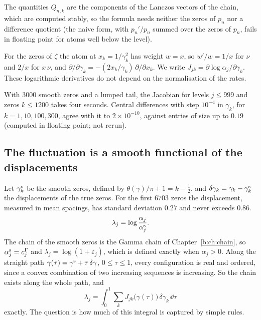 The quantities $Q_{n,k}$ are the components of the Lanczos vectors of the chain, which are computed stably, so the formula needs neither the zeros of $p_n$ nor a difference quotient (the naive form, with $p_n'/p_n$ summed over the zeros of $p_n$, fails in floating point for atoms well below the level).

For the zeros of $\zeta$ the atom at $x_k=1/\gamma_k^2$ has weight $w=x$, so $w'/w=1/x$ for $\nu$ and $2/x$ for $x\,\nu$, and $\partial/\partial\gamma_k=-(2x_k/\gamma_k)\,\partial/\partial x_k$. We write $J_{jk}=\partial\log\alpha_j/\partial\gamma_k$. These logarithmic derivatives do not depend on the normalisation of the rates.

\begin{computation}\label{pp:comp:check}
With $3000$ smooth zeros and a lumped tail, the Jacobian for levels $j\le999$ and zeros $k\le1200$ takes four seconds. Central differences with step $10^{-4}$ in $\gamma_k$, for $k=1,10,100,300$, agree with it to $2\times10^{-10}$, against entries of size up to $0.19$ (computed in floating point; not rerun).
\end{computation}

\subsection{The fluctuation is a smooth functional of the displacements}

Let $\gamma_k^{\rm s}$ be the smooth zeros, defined by $\theta(\gamma)/\pi+1=k-\frac12$, and $\delta\gamma_k=\gamma_k-\gamma_k^{\rm s}$ the displacements of the true zeros. For the first $6703$ zeros the displacement, measured in mean spacings, has standard deviation $0.27$ and never exceeds $0.86$.
\[
\lambda_j=\log\frac{\alpha_j}{\alpha^{\rm s}_j}.
\]
The chain of the smooth zeros is the Gamma chain of Chapter~\ref{b:ch:chain}, so $\alpha^{\rm s}_j=c^\Gamma_j$ and $\lambda_j=\log(1+\varepsilon_j)$, which is defined exactly when $\alpha_j>0$. Along the straight path $\gamma(\tau)=\gamma^{\rm s}+\tau\,\delta\gamma$, $0\le\tau\le1$, every configuration is real and ordered, since a convex combination of two increasing sequences is increasing. So the chain exists along the whole path, and
\begin{equation}\label{pp:eq:path}
\lambda_j=\int_0^1\sum_kJ_{jk}\big(\gamma(\tau)\big)\,\delta\gamma_k\,\dd\tau
\end{equation}
exactly. The question is how much of this integral is captured by simple rules.


